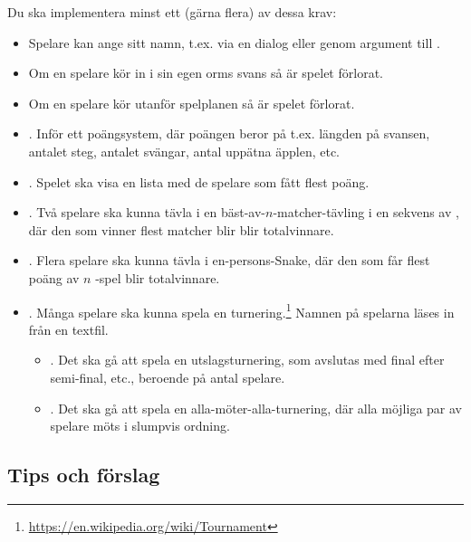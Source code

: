 Du ska implementera minst ett (gärna flera) av dessa krav:
\begin{itemize}[nosep, label={$\square$}]
\item Spelare kan ange sitt namn, t.ex. via en dialog eller genom argument till .
\item Om en spelare kör in i sin egen orms svans så är spelet förlorat. %
\item Om en spelare kör utanför spelplanen så är spelet förlorat. %
\item \textbf{}. Inför ett poängsystem, där poängen beror på t.ex. längden på svansen, antalet steg, antalet svängar, antal uppätna äpplen, etc.
\item \textbf{}. Spelet ska visa en lista med de spelare som fått flest poäng.

\item \textbf{}. Två spelare ska kunna tävla i en bäst-av-$n$-matcher-tävling i en sekvens av , där den som vinner flest matcher blir blir totalvinnare.

\item \textbf{}. Flera spelare ska kunna tävla i en-persons-Snake, där den som får flest poäng av $n$ -spel blir totalvinnare.


\item \textbf{}. Många spelare ska kunna spela en turnering.\footnote{\url{https://en.wikipedia.org/wiki/Tournament}} Namnen på spelarna läses in från en textfil.
\begin{itemize}[nosep, label={$\square$}]
\item \textbf{}. Det ska gå att spela en utslagsturnering, som avslutas med final efter semi-final, etc., beroende på antal spelare.
\item \textbf{}. Det ska gå att spela en alla-möter-alla-turnering, där alla möjliga par av spelare möts i slumpvis ordning.
\end{itemize}

\end{itemize}


\subsection{Tips och förslag}\label{lab:snake:tips}

